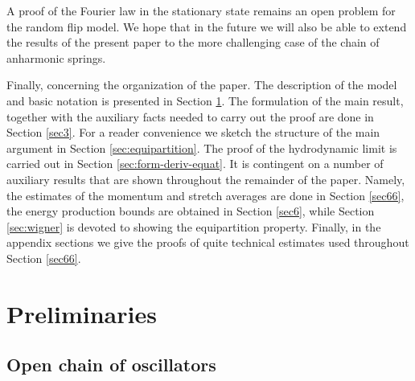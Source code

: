 \documentclass[EJP]{ejpecp} %
\numberwithin{equation}{section}
\begin{document}
  A proof of the Fourier law in the stationary state  remains an open
  problem for the random flip model.  
We hope that in the future we will also be able to extend the results of the present paper to the more
challenging case of the chain of anharmonic springs.

Finally, concerning the organization of the paper. The description of
the model and basic notation is presented in Section
\ref{sec:adiab-micr-dynam}. The formulation of the main result,
together with the auxiliary facts needed to carry out the proof are done
in Section \ref{sec3}. For a reader convenience we sketch the
structure of the main
argument in Section \ref{sec:equipartition}.
The proof of the hydrodynamic limit is carried out in Section
\ref{sec:form-deriv-equat}. It is contingent on a number of auxiliary
results that are shown throughout the remainder of the paper. Namely,
the estimates of the momentum and stretch averages are done in Section
\ref{sec66}, the energy production bounds are obtained in  Section
\ref{sec6}, while Section \ref{sec:wigner} is devoted to showing the
equipartition property. Finally, in the appendix sections we give the
proofs of quite technical estimates used throughout Section \ref{sec66}.
   
  

\section{Preliminaries}
\label{sec:adiab-micr-dynam}

\subsection{Open chain of oscillators}
\end{document}

